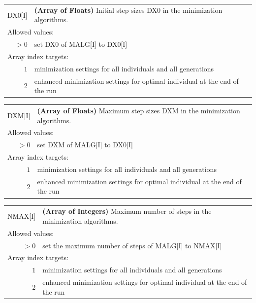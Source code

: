 \documentclass[10pt,a4paper,openany]{memoir}
\numberwithin{equation}{section}
\begin{document}
{
\begin{tabular}{r@{ : }l}
\label{descr:dx0}
       DX0[I]&\textbf{(Array of Floats)} Initial step sizes DX0 in the minimization algorithms.                                               \\ 
\multicolumn{2}{l}{Allowed values:} \\ 
    \(>0\)&set DX0 of MALG[I] to DX0[I]                                                                         \\ 
\multicolumn{2}{l}{Array index targets:} \\ 
     \(1\)&minimization settings for all individuals and all generations \\
     \(2\)&enhanced minimization settings for optimal individual at the end of the run \\
\end{tabular}
\vspace{1ex}
}

{
\begin{tabular}{r@{ : }l}
\label{descr:dxm}
  DXM[I]&\textbf{(Array of Floats)} Maximum step sizes DXM in the minimization algorithms.                                               \\ 
\multicolumn{2}{l}{Allowed values:} \\ 
  \(>0\)&set DXM of MALG[I] to DX0[I]                                                                         \\ 
\multicolumn{2}{l}{Array index targets:} \\ 
  \(1\)&minimization settings for all individuals and all generations \\
  \(2\)&enhanced minimization settings for optimal individual at the end of the run \\
\end{tabular}
\vspace{1ex}
}

{
\begin{tabular}{r@{ : }l}
\label{descr:nmax}
      NMAX[I]&\textbf{(Array of Integers)} Maximum number of steps in the minimization algorithms.                                              \\ 
\multicolumn{2}{l}{Allowed values:} \\ 
    \(>0\)&set the maximum number of steps of MALG[I] to NMAX[I]                                                \\ 
\multicolumn{2}{l}{Array index targets:} \\ 
  \(1\)&minimization settings for all individuals and all generations \\
  \(2\)&enhanced minimization settings for optimal individual at the end of the run \\
\end{tabular}
\vspace{1ex}
}
\end{document}
